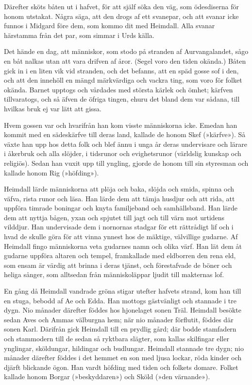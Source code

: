 Därefter sköts båten ut i hafvet, för att själf söka den väg, som
ödesdiserna för honom utstakat. Några säga, att den drogs af ett
svanepar, och att svanar icke funnos i Midgard före dem, som kommo dit
med Heimdall. Alla svanar härstamma från det par, som simmar i Urds
källa.

Det hände en dag, att människor, som stodo på stranden af
Aurvangalandet, sågo en båt nalkas utan att vara drifven af åror. (Segel
voro den tiden okända.) Båten gick in i en liten vik vid stranden, och
det befanns, att en späd gosse sof i den, och att den innehöll en mängd
märkvärdiga och vackra ting, som voro för folket okända. Barnet upptogs
och vårdades med största kärlek och ömhet; kärfven tillvaratogs, och så
äfven de öfriga tingen, ehuru det bland dem var sådana, till hvilkas
bruk ej var lätt att gissa.

Hvem gossen var och hvarifrån han kom visste människorna icke. Emedan
han kommit med en sädeskärfve till deras land, kallade de honom Skef
(»kärfve»). Så växte han upp hos detta folk och blef ännu i unga år
deras undervisare och lärare i åkerbruk och alla slöjder, i tidsrunor
och evighetsrunor (världslig kunskap och religiös). Sedan han
\protect\hypertarget{lb1625905.xhtmlux5cux23start22}{}{}\protect\hypertarget{lb1625905.xhtmlux5cux23start22-a}{}{}\protect\hypertarget{lb1625905.xhtmlux5cux23start22-b}{}{}\protect\hypertarget{lb1625905.xhtmlux5cux23start22-c}{}{}\protect\hypertarget{lb1625905.xhtmlux5cux23start22-d}{}{}
vuxit upp till yngling, gjorde de honom till sin styresman och kallade
honom Rig (»höfding»).

Heimdall lärde människorna att plöja och baka, slöjda och smida, spinna
och väfva, rista runor och läsa. Han lärde dem att tämja husdjur och att
rida, att uppföra timrade boningar och knyta familjeband och
samhällsband. Han lärde dem att nyttja bågen, yxan och spjutet till jagt
och till värn mot urtidens vilddjur. Han undervisade dem i nornornas
stadgar för ett rättrådigt lif och i hvad de skulle göra för att vinna
ynnest hos de mäktige, välvillige gudarne. Af Heimdall fingo människorna
veta gudarnes namn och olika värf. Han lät dem åt gudarne uppföra
altaren och tempel, framkallade med eldborren den rena eld, som ensam är
värdig att brinna i deras tjänst, och förestafvade de böner och heliga
sånger, som alltsedan från människoläppar ljudit till makternas lof.

En gång då Heimdall vandrade gröna stigar utefter hafvets strand, kom
han till en stuga, bebodd af Ae och Edda. Han mottogs gästvänligt och
stannade i tre dygn. Nio månader därefter föddes hos hjonelaget sonen
Träl. Heimdall besökte sedan Aves och Ammas välburgna hem; när nio
månader förflutit, föddes där sonen Karl. Därifrån gick Heimdall till en
prydlig gård; där bodde stamfadern och stammodern till de sedan så
ryktbara slägter, som kallas skilfingar eller ynglingar, sköldungar,
hildingar och budlungar. Heimdall stannade tre dygn; nio månader
därefter föddes i det hemmet en son med ljusa lockar, röda kinder och
djärft blickande ögon. Han vardt höfding med tiden och folkets domare.
Folket kallade honom Borgar (»beskyddaren») och Sköld (»den värnande»).

